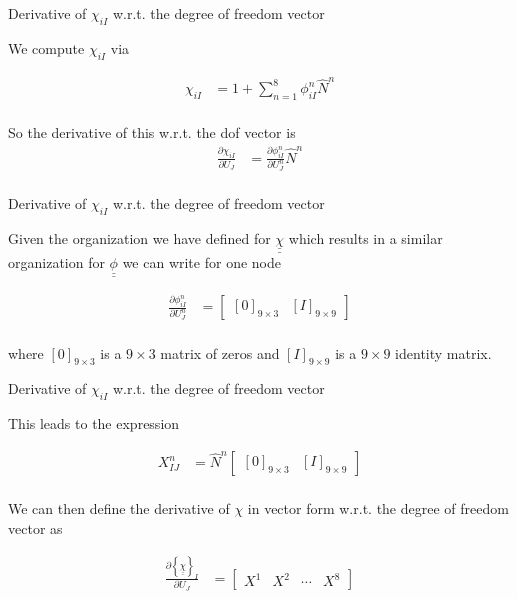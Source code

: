 \documentclass[11pt]{beamer}
\newcommand{\TEN}[1]{\underline{\underline{#1}}}
\begin{document}
\begin{frame}{Derivative of $\chi_{iI}$ w.r.t. the degree of freedom vector}

We compute $\chi_{iI}$ via

\begin{align*}
\chi_{iI} &= 1+\sum_{n=1}^8 \phi_{iI}^n \hat{N}^n\\
\end{align*}

So the derivative of this w.r.t. the dof vector is
\begin{align*}
\frac{\partial \chi_{iI}}{\partial U_J} &= \frac{\partial \phi_{iI}^n}{\partial U_{J}^n}\hat{N}^n\\
\end{align*}


\end{frame}

\begin{frame}{Derivative of $\chi_{iI}$ w.r.t. the degree of freedom vector}

Given the organization we have defined for $\TEN{\chi}$ which results in a similar organization for $\TEN{\phi}$ we can write for one node

\begin{align*}
\frac{\partial \phi_{iI}^n}{\partial U_{J}^n} &= \left[\begin{array}{cc}
\left[0\right]_{9\times 3} & \left[I\right]_{9 \times 9}
\end{array} \right]\\
\end{align*}

where $[0]_{9 \times 3}$ is a $9 \times 3$ matrix of zeros and $[I]_{9 \times 9}$ is a $9 \times 9$ identity matrix.

\end{frame}

\begin{frame}{Derivative of $\chi_{iI}$ w.r.t. the degree of freedom vector}

This leads to the expression

\begin{align*}
X_{IJ}^n &= \hat{N}^n\left[\begin{array}{cc}
\left[0\right]_{9\times 3} & \left[I\right]_{9 \times 9}
\end{array} \right]\\
\end{align*}

We can then define the derivative of $\chi$ in vector form w.r.t. the degree of freedom vector as

\begin{align*}
\frac{\partial \left\{\TEN{\chi}\right\}_I}{\partial U_{J}} &= \left[\begin{array}{cccc}
X^1 & X^2 & \cdots & X^8
\end{array}\right]
\end{align*}

\end{frame}
\end{document}
